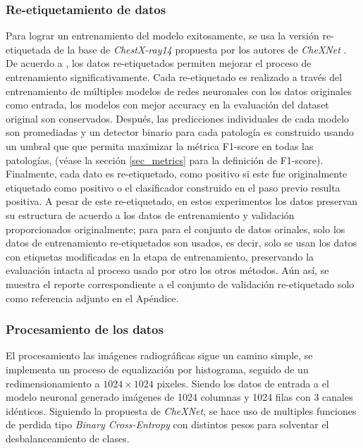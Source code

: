 {\subsubsection{Re-etiquetamiento de datos}
\label{ssec_relabelling}

Para lograr un entrenamiento del modelo exitosamente, se usa la versión re-etiquetada de la base de
\textit{ChestX-ray14} propuesta por los autores de \textit{CheXNet} \cite{rajpurkar2018deep}. De
acuerdo a \cite{rajpurkar2018deep}, los datos re-etiquetados permiten mejorar el proceso de entrenamiento
significativamente. Cada re-etiquetado es realizado a través del entrenamiento de múltiples modelos
de redes neuronales con los datos originales como entrada, los modelos con mejor accuracy en la
evaluación del dataset original son conservados. Después, las predicciones individuales de cada
modelo son promediadas y un detector binario para cada patología es construido usando un umbral que
que permita maximizar la métrica F1-score en todas las patologías, (véase la sección \ref{sec_metrics}
para la definición de F1-score). Finalmente, cada dato es re-etiquetado, como positivo si este fue
originalmente etiquetado como positivo o el clasificador construido en el paso previo resulta positiva.
A pesar de este re-etiquetado, en estos experimentos los datos preservan su estructura de acuerdo a
los datos de entrenamiento y validación proporcionados originalmente; para para el conjunto de datos
orinales, solo los datos de entrenamiento re-etiquetados son usados, es decir, solo se usan los datos
con etiquetas modificadas en la etapa de entrenamiento, preservando la evaluación intacta al proceso
usado por otro los otros métodos. Aún así, se muestra el reporte correspondiente a el conjunto de
validación re-etiquetado solo como referencia adjunto en el Apéndice.

\subsubsection{Procesamiento de los datos}

El procesamiento las imágenes radiográficas sigue un camino simple, se implementa un proceso de
equalización por histograma, seguido de un redimensionamiento a $1024 \times 1024$ pixeles. Siendo
los datos de entrada a el modelo neuronal generado imágenes de 1024  columnas y 1024 filas con 3
canales idénticos. Siguiendo la propuesta de \textit{CheXNet}, se hace uso de multiples funciones de
perdida tipo \textit{Binary Cross-Entropy} con distintos pesos para solventar el desbalanceamiento
de clases.

}

